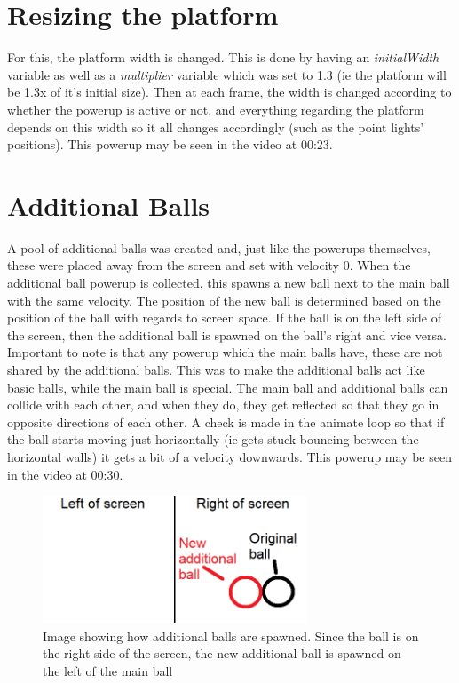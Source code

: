 \section{Resizing the platform}
For this, the platform width is changed. This is done by having an \textit{initialWidth} variable as well as a \textit{multiplier} variable which was set to 1.3 (ie the platform will be 1.3x of it's initial size). Then at each frame, the width is changed according to whether the powerup is active or not, and everything regarding the platform depends on this width so it all changes accordingly (such as the point lights' positions).  This powerup may be seen in the video at 00:23.

\section{Additional Balls}
A pool of additional balls was created and, just like the powerups themselves, these were placed away from the screen and set with velocity 0. When the additional ball powerup is collected, this spawns a new ball next to the main ball with the same velocity. The position of the new ball is determined based on the position of the ball with regards to screen space. If the ball is on the left side of the screen, then the additional ball is spawned on the ball's right and vice versa. Important to note is that any powerup which the main balls have, these are not shared by the additional balls. This was to make the additional balls act like basic balls, while the main ball is special. The main ball and additional balls can collide with each other, and when they do, they get reflected so that they go in opposite directions of each other. A check is made in the animate loop so that if the ball starts moving just horizontally (ie gets stuck bouncing between the horizontal walls) it gets a bit of a velocity downwards. This powerup may be seen in the video at 00:30.

\begin{figure}[H]
	\centering
	\includegraphics[width=0.7\textwidth]{Images/AdditionalBall.png}
	\caption{Image showing how additional balls are spawned. Since the ball is on the right side of the screen, the new additional ball is spawned on the left of the main ball}
\end{figure}

